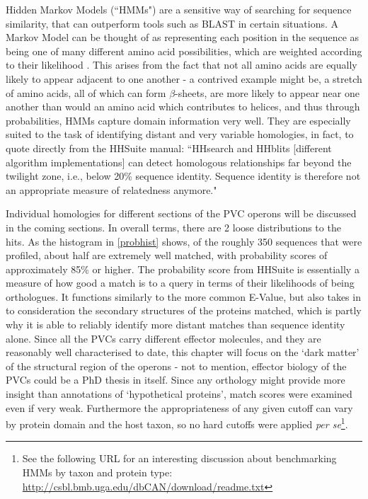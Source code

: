 Hidden Markov Models (``HMMs") are a sensitive way of searching for sequence similarity, that can outperform tools such as BLAST in certain situations. A Markov Model can be thought of as representing each position in the sequence as being one of many different amino acid possibilities, which are weighted according to their likelihood \citep{Eddy2004}. This arises from the fact that not all amino acids are equally likely to appear adjacent to one another - a contrived example might be, a stretch of amino acids, all of which can form $\beta$-sheets, are more likely to appear near one another than would an amino acid which contributes to helices, and thus through probabilities, HMMs capture domain information very well. They are especially suited to the task of identifying distant and very variable homologies, in fact, to quote directly from the HHSuite manual: ``HHsearch and HHblits [different algorithm implementations] can detect homologous relationships far beyond the twilight zone, i.e., below 20\% sequence identity. Sequence identity is therefore not an appropriate measure of relatedness anymore."

Individual homologies for different sections of the PVC operons will be discussed in the coming sections. In overall terms, there are 2 loose distributions to the hits. As the histogram in \vref{probhist} shows, of the roughly 350 sequences that were profiled, about half are extremely well matched, with probability scores of approximately 85\% or higher. The probability score from HHSuite is essentially a measure of how good a match is to a query in terms of their likelihoods of being orthologues. It functions similarly to the more common E-Value, but also takes in to consideration the secondary structures of the proteins matched, which is partly why it is able to reliably identify more distant matches than sequence identity alone. Since all the PVCs carry different effector molecules, and they are reasonably well characterised to date, this chapter will focus on the `dark matter' of the structural region of the operons - not to mention, effector biology of the PVCs could be a PhD thesis in itself. Since any orthology might provide more insight than annotations of `hypothetical proteins', match scores were examined even if very weak. Furthermore the appropriateness of any given cutoff can vary by protein domain and the host taxon, so no hard cutoffs were applied \emph{per se}\footnote{See the following URL for an interesting discussion about benchmarking HMMs by taxon and protein type: \url{http://csbl.bmb.uga.edu/dbCAN/download/readme.txt}}.

